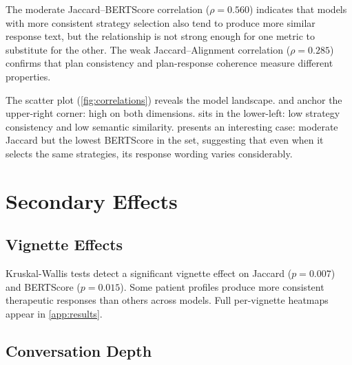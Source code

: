 The moderate Jaccard--BERTScore correlation ($\rho = 0.560$) indicates
that models with more consistent strategy selection also tend to produce
more similar response text, but the relationship is not strong enough
for one metric to substitute for the other. The weak Jaccard--Alignment
correlation ($\rho = 0.285$) confirms that plan consistency and
plan-response coherence measure different properties.

The scatter plot (\autoref{fig:correlations}) reveals the model landscape.
 and  anchor the upper-right
corner: high on both dimensions.  sits in the
lower-left: low strategy consistency and low semantic similarity.
 presents an interesting case: moderate Jaccard
but the lowest BERTScore in the set, suggesting that even when it selects
the same strategies, its response wording varies considerably.


\section{Secondary Effects}
\label{sec:res-secondary}

\subsection{Vignette Effects}

Kruskal-Wallis tests detect a significant vignette effect on Jaccard
($p = 0.007$) and BERTScore ($p = 0.015$). Some patient profiles produce
more consistent therapeutic responses than others across models. Full
per-vignette heatmaps appear in \autoref{app:results}.


\subsection{Conversation Depth}

